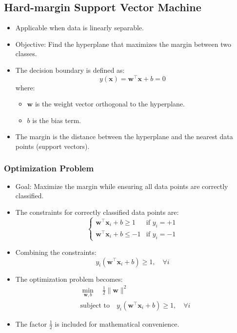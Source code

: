 \documentclass{article}
\begin{document}
\subsection{Hard-margin Support Vector Machine}

\begin{itemize}
    \item Applicable when data is linearly separable.
    \item Objective: Find the hyperplane that maximizes the margin between two classes.
    \item The decision boundary is defined as:
    \[
    y(\mathbf{x}) = \mathbf{w}^\top \mathbf{x} + b = 0
    \]
    where:
    \begin{itemize}
        \item $\mathbf{w}$ is the weight vector orthogonal to the hyperplane.
        \item $b$ is the bias term.
    \end{itemize}
    \item The margin is the distance between the hyperplane and the nearest data points (support vectors).
\end{itemize}

\subsubsection{Optimization Problem}

\begin{itemize}
    \item Goal: Maximize the margin while ensuring all data points are correctly classified.
    \item The constraints for correctly classified data points are:
    \[
    \begin{cases}
    \mathbf{w}^\top \mathbf{x}_i + b \geq 1 & \text{if } y_i = +1 \\
    \mathbf{w}^\top \mathbf{x}_i + b \leq -1 & \text{if } y_i = -1
    \end{cases}
    \]
    \item Combining the constraints:
    \[
    y_i (\mathbf{w}^\top \mathbf{x}_i + b) \geq 1, \quad \forall i
    \]
    \item The optimization problem becomes:
    \[
    \begin{aligned}
    & \min_{\mathbf{w}, b} \quad \frac{1}{2} \|\mathbf{w}\|^2 \\
    & \text{subject to} \quad y_i (\mathbf{w}^\top \mathbf{x}_i + b) \geq 1, \quad \forall i
    \end{aligned}
    \]
    \item The factor $\frac{1}{2}$ is included for mathematical convenience.
\end{itemize}
\end{document}
